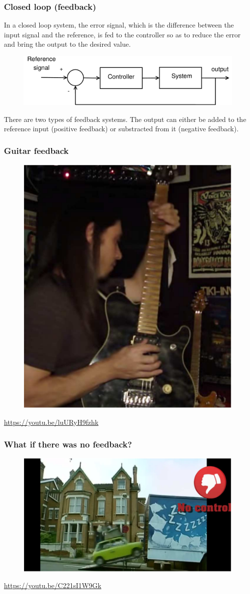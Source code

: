 \begin{frame}
	\frametitle{Closed loop (feedback)}
	In a closed loop system, the error signal, which is the difference between the input signal and the reference, is fed to the controller so as to reduce the error and bring the output to the desired value. 
	\medskip
	\begin{figure}
		\includegraphics[width=1\linewidth]{closed_loop}
	\end{figure}
	\medskip
	There are two types of feedback systems. The output can either be added to the reference input (positive feedback) or substracted from it (negative feedback).
\end{frame}

\begin{frame}
	\frametitle{Guitar feedback}
	\begin{figure}
		\includegraphics[width=.4\linewidth]{guitar}
	\end{figure}
	\url{https://youtu.be/luURyH9fzhk}
\end{frame}

\begin{frame}
	\frametitle{What if there was no feedback?}
	\begin{figure}
		\includegraphics[width=.9\linewidth]{no_feedback}
	\end{figure}
	\url{https://youtu.be/C221sI1W9Gk}
\end{frame}

